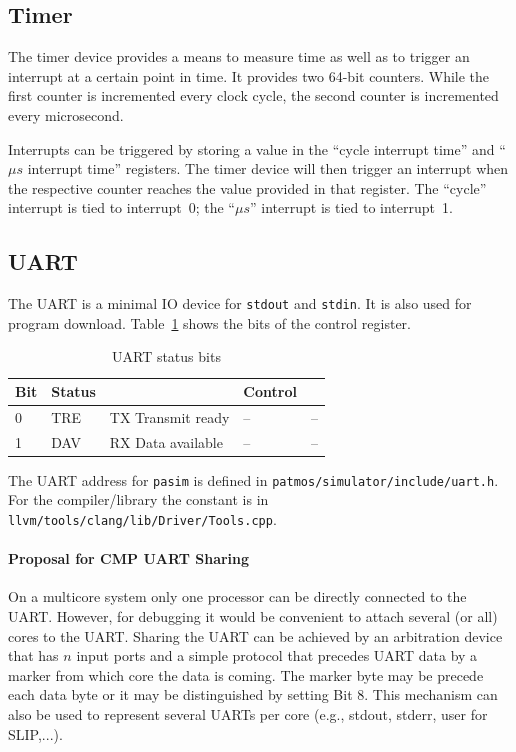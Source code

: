 \documentclass[a4paper,fontsize=10pt,twoside,DIV15,BCOR12mm,headinclude=true,footinclude=false,pagesize,bibtotoc]{scrbook}
\newcommand{\code}[1]{{\texttt{#1}}}
\newcommand{\comment}[3]{

\textsf{\textbf{#1}} {\color{#3}#2}}
\newcommand{\martin}[1]{\comment{Martin}{#1}{Blue}}
\renewcommand{\martin}[1]{}
\begin{document}
\subsection{Timer}

The timer device provides a means to measure time as well as to
trigger an interrupt at a certain point in time. It provides two
64-bit counters. While the first counter is incremented every clock
cycle, the second counter is incremented every microsecond.

Interrupts can be triggered by storing a value in the ``cycle
interrupt time'' and ``$\mu s$ interrupt time'' registers. The timer
device will then trigger an interrupt when the respective counter
reaches the value provided in that register. The ``cycle'' interrupt
is tied to interrupt~0; the ``$\mu s$'' interrupt is tied to
interrupt~1.

\subsection{UART}

The UART is a minimal IO device for \texttt{stdout} and \texttt{stdin}.
It is also used for program download. Table~\ref{tab:uart} shows the
bits of the control register.

\begin{table}
\centering
\begin{tabular}{lllll}
\toprule
Bit & Status & & Control & \\
\midrule
0 & TRE & TX Transmit ready & -- & -- \\
1 & DAV & RX Data available & -- & -- \\
\bottomrule
\end{tabular}
\caption{UART status bits} %
\label{tab:uart}
\end{table}

The UART address for \code{pasim} is defined in \code{patmos/simulator/include/uart.h}.
For the compiler/library the constant is in \code{llvm/tools/clang/lib/Driver/Tools.cpp}.

\paragraph{Proposal for CMP UART Sharing}
On a multicore system only one processor can be directly connected to the
UART. However, for debugging it would be convenient to attach several (or all)
cores to the UART. Sharing the UART can be achieved by an arbitration device
that has $n$ input ports and a simple protocol that precedes UART data by a
marker from which core the data is coming. The marker byte may be precede
each data byte or it may be distinguished by setting Bit 8. This mechanism can
also be used to represent several UARTs per core (e.g., stdout, stderr, user for SLIP,...).
\martin{The protocol shall be done in HW -- let's find a student for this.}
\end{document}
